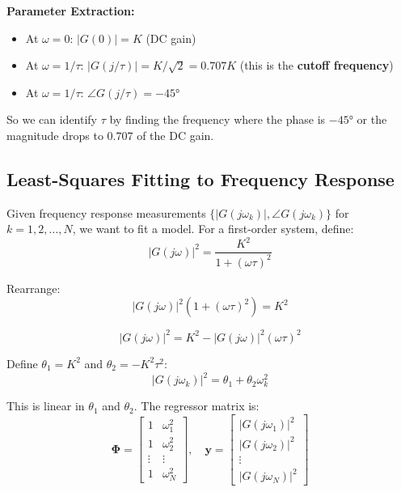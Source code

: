 \textbf{Parameter Extraction:}
\begin{itemize}
    \item At $\omega = 0$: $|G(0)| = K$ (DC gain)
    \item At $\omega = 1/\tau$: $|G(j/\tau)| = K/\sqrt{2} = 0.707K$ (this is the \textbf{cutoff frequency})
    \item At $\omega = 1/\tau$: $\angle G(j/\tau) = -45°$
\end{itemize}

So we can identify $\tau$ by finding the frequency where the phase is $-45°$ or the magnitude drops to $0.707$ of the DC gain.

\subsection{Least-Squares Fitting to Frequency Response}

Given frequency response measurements $\{|G(j\omega_k)|, \angle G(j\omega_k)\}$ for $k = 1, 2, \ldots, N$, we want to fit a model. For a first-order system, define:
\begin{equation}
|G(j\omega)|^2 = \frac{K^2}{1 + (\omega\tau)^2}
\end{equation}

Rearrange:
\begin{equation}
|G(j\omega)|^2 (1 + (\omega\tau)^2) = K^2
\end{equation}

\begin{equation}
|G(j\omega)|^2 = K^2 - |G(j\omega)|^2(\omega\tau)^2
\end{equation}

Define $\theta_1 = K^2$ and $\theta_2 = -K^2\tau^2$:
\begin{equation}
|G(j\omega_k)|^2 = \theta_1 + \theta_2 \omega_k^2
\end{equation}

This is linear in $\theta_1$ and $\theta_2$. The regressor matrix is:
\begin{equation}
\mathbf{\Phi} = \begin{bmatrix}
1 & \omega_1^2 \\
1 & \omega_2^2 \\
\vdots & \vdots \\
1 & \omega_N^2
\end{bmatrix}, \quad
\mathbf{y} = \begin{bmatrix}
|G(j\omega_1)|^2 \\
|G(j\omega_2)|^2 \\
\vdots \\
|G(j\omega_N)|^2
\end{bmatrix}
\end{equation}


